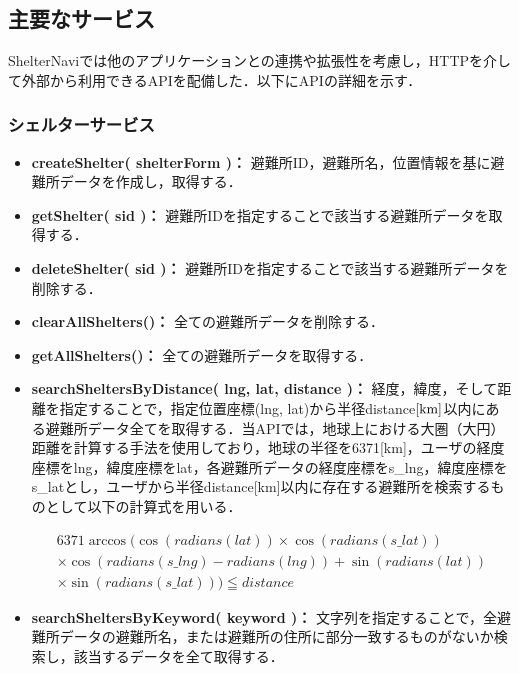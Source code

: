 \documentclass[technicalreport,dvipdfmx]{ieicej}
\begin{document}
\subsection{主要なサービス}
ShelterNaviでは他のアプリケーションとの連携や拡張性を考慮し，HTTPを介して外部から利用できるAPIを配備した．以下にAPIの詳細を示す．

\subsubsection{シェルターサービス}
\begin{itemize}
    \item{\textbf{createShelter( shelterForm )：}
         避難所ID，避難所名，位置情報を基に避難所データを作成し，取得する．}
    \item{\textbf{getShelter( sid )：}
         避難所IDを指定することで該当する避難所データを取得する．}
    \item{\textbf{deleteShelter( sid )：}
         避難所IDを指定することで該当する避難所データを削除する．}
    \item{\textbf{clearAllShelters()：}
         全ての避難所データを削除する．}
    \item{\textbf{getAllShelters()：}
         全ての避難所データを取得する．}
    \item{\textbf{searchSheltersByDistance( lng, lat, distance )：}
         経度，緯度，そして距離を指定することで，指定位置座標(lng, lat)から半径distance$\rm[km]$以内にある避難所データ全てを取得する．当APIでは，地球上における大圏（大円）距離を計算する手法を使用しており，地球の半径を6371[km]，ユーザの経度座標をlng，緯度座標をlat，各避難所データの経度座標をs\_lng，緯度座標をs\_latとし，ユーザから半径distance[km]以内に存在する避難所を検索するものとして以下の計算式を用いる．

         \begin{eqnarray*}
             6371 \arccos ( \cos( radians( lat ) ) \times \cos( radians( s\_lat ) ) \\
             \times \cos( radians( s\_lng ) - radians( lng ) ) + \sin( radians( lat ) ) \\
             \times \sin( radians( s\_lat ) ) ) \leqq distance
         \end{eqnarray*}}
    \item{\textbf{searchSheltersByKeyword( keyword )：}
         文字列を指定することで，全避難所データの避難所名，または避難所の住所に部分一致するものがないか検索し，該当するデータを全て取得する．}
\end{itemize}
\end{document}
